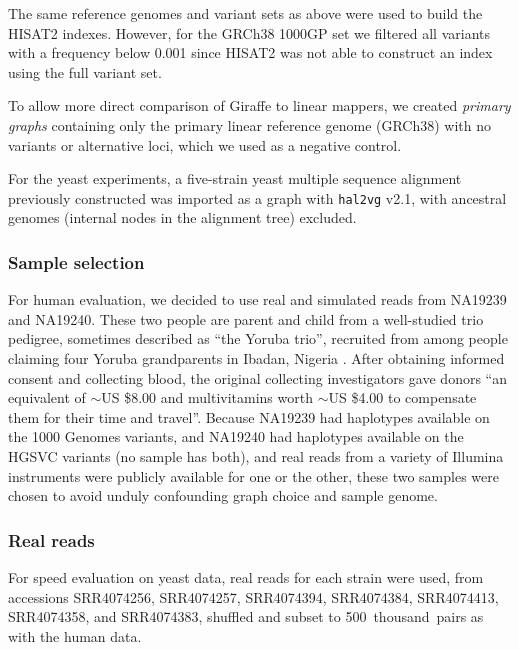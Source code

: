 \documentclass[11pt]{ucscthesis}
\newcommand{\vocab}[1]{\emph{#1}}
\begin{document}
The same reference genomes and variant sets as above were used to build the HISAT2 indexes.
However, for the GRCh38 1000GP set we filtered all variants with a frequency below 0.001 since HISAT2 was not able to construct an index using the full variant set.

To allow more direct comparison of Giraffe to linear mappers, we created \vocab{primary graphs} containing only the primary linear reference genome (GRCh38) with no variants or alternative loci, which we used as a negative control.

For the yeast experiments, a five-strain yeast multiple sequence alignment previously constructed \cite{hickey_vgsv_2020} was imported as a graph with \texttt{hal2vg} v2.1\cite{hickey_vgsv_2020}, with ancestral genomes (internal nodes in the alignment tree) excluded.


\subsubsection{Sample selection}

For human evaluation, we decided to use real and simulated reads from NA19239 and NA19240. These two people are parent and child from a well-studied trio pedigree, sometimes described as ``the Yoruba trio'', recruited from among people claiming four Yoruba grandparents in Ibadan, Nigeria \cite{international2005haplotype,abyzov2011cnvnator}.
After obtaining informed consent and collecting blood, the original collecting investigators gave donors ``an equivalent of $\sim$US \$8.00 and multivitamins worth $\sim$US \$4.00 to compensate them for their time and travel''\cite{international2004integrating}.
Because NA19239 had haplotypes available on the 1000 Genomes variants, and NA19240 had haplotypes available on the HGSVC variants (no sample has both), and real reads from a variety of Illumina instruments were publicly available for one or the other, these two samples were chosen to avoid unduly confounding graph choice and sample genome.


\subsubsection{Real reads}

For speed evaluation on yeast data, real reads for each strain were used, from accessions SRR4074256, SRR4074257, SRR4074394, SRR4074384, SRR4074413, SRR4074358, and SRR4074383, shuffled and subset to 500~thousand~pairs as with the human data.
\end{document}
